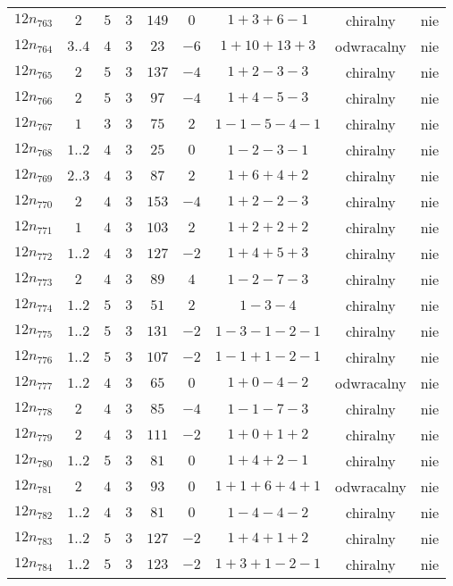 \begin{longtable}{ccccccccc}
$12n_{763}$ & $2$ & $5$ & $3$ & $149$ & $0$ & $1+3+6-1$ & chiralny & nie \\
$12n_{764}$ & $3..4$ & $4$ & $3$ & $23$ & $-6$ & $1+10+13+3$ & odwracalny & nie \\
$12n_{765}$ & $2$ & $5$ & $3$ & $137$ & $-4$ & $1+2-3-3$ & chiralny & nie \\
$12n_{766}$ & $2$ & $5$ & $3$ & $97$ & $-4$ & $1+4-5-3$ & chiralny & nie \\
$12n_{767}$ & $1$ & $3$ & $3$ & $75$ & $2$ & $1-1-5-4-1$ & chiralny & nie \\
$12n_{768}$ & $1..2$ & $4$ & $3$ & $25$ & $0$ & $1-2-3-1$ & chiralny & nie \\
$12n_{769}$ & $2..3$ & $4$ & $3$ & $87$ & $2$ & $1+6+4+2$ & chiralny & nie \\
$12n_{770}$ & $2$ & $4$ & $3$ & $153$ & $-4$ & $1+2-2-3$ & chiralny & nie \\
$12n_{771}$ & $1$ & $4$ & $3$ & $103$ & $2$ & $1+2+2+2$ & chiralny & nie \\
$12n_{772}$ & $1..2$ & $4$ & $3$ & $127$ & $-2$ & $1+4+5+3$ & chiralny & nie \\
$12n_{773}$ & $2$ & $4$ & $3$ & $89$ & $4$ & $1-2-7-3$ & chiralny & nie \\
$12n_{774}$ & $1..2$ & $5$ & $3$ & $51$ & $2$ & $1-3-4$ & chiralny & nie \\
$12n_{775}$ & $1..2$ & $5$ & $3$ & $131$ & $-2$ & $1-3-1-2-1$ & chiralny & nie \\
$12n_{776}$ & $1..2$ & $5$ & $3$ & $107$ & $-2$ & $1-1+1-2-1$ & chiralny & nie \\
$12n_{777}$ & $1..2$ & $4$ & $3$ & $65$ & $0$ & $1+0-4-2$ & odwracalny & nie \\
$12n_{778}$ & $2$ & $4$ & $3$ & $85$ & $-4$ & $1-1-7-3$ & chiralny & nie \\
$12n_{779}$ & $2$ & $4$ & $3$ & $111$ & $-2$ & $1+0+1+2$ & chiralny & nie \\
$12n_{780}$ & $1..2$ & $5$ & $3$ & $81$ & $0$ & $1+4+2-1$ & chiralny & nie \\
$12n_{781}$ & $2$ & $4$ & $3$ & $93$ & $0$ & $1+1+6+4+1$ & odwracalny & nie \\
$12n_{782}$ & $1..2$ & $4$ & $3$ & $81$ & $0$ & $1-4-4-2$ & chiralny & nie \\
$12n_{783}$ & $1..2$ & $5$ & $3$ & $127$ & $-2$ & $1+4+1+2$ & chiralny & nie \\
$12n_{784}$ & $1..2$ & $5$ & $3$ & $123$ & $-2$ & $1+3+1-2-1$ & chiralny & nie \\

\end{longtable}
